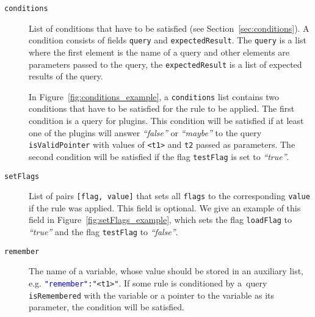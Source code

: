 \begin{description}
    \item[\texttt{conditions}] List of conditions that have to be satisfied
    (see Section~\ref{sec:conditions}). A condition consists of fields
    \texttt{query} and \texttt{expectedResult}. The \texttt{query} is a list
    where the first element is the name of a query and other elements are
    parameters passed to the query, the \texttt{expectedResult} is a list of
    expected results of the query.

    In Figure~\ref{fig:conditions_example}, a \texttt{conditions} list contains
    two conditions that have to be satisfied for the rule to be applied. The
    first condition is a query for plugins. This condition will be satisfied if
    at least one of the plugins will answer \emph{``false''} or \emph{``maybe''} to
    the query \texttt{isValidPointer} with values of \texttt{<t1>} and
    \texttt{t2} passed as parameters. The second condition will be satisfied if
    the flag \texttt{testFlag} is set to \emph{``true''}.

    \begin{minipage}{\linewidth}
        
        \label{fig:conditions_example}
      \end{minipage}

    \item[\texttt{setFlags}] List of pairs \texttt{[flag, value]} that sets all
    \texttt{flags} to the corresponding \texttt{value} if the rule was applied.
    This field is optional. We give an example of this field in
    Figure~\ref{fig:setFlags_example}, which sets the flag \texttt{loadFlag}
    to \emph{``true''} and the flag \texttt{testFlag} to \emph{``false''}.

     \begin{minipage}{\linewidth}
        
        \label{fig:setFlags_example}
      \end{minipage}

    \item[\texttt{remember}] The name of a variable, whose value should be stored in an
    auxiliary list, e.g. \texttt{\textcolor{blue}{"remember"}:"<t1>"}. If some
    rule is conditioned by a~query \texttt{isRemembered} with the variable or a
    pointer to the variable as its parameter, the condition will be satisfied.
\end{description}

